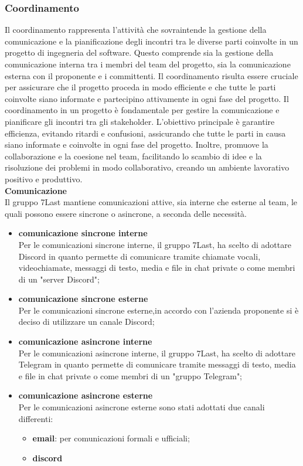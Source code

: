\subsubsection{Coordinamento}
Il coordinamento rappresenta l’attività che sovraintende la gestione della comunicazione e la pianificazione degli incontri tra le diverse parti coinvolte in un progetto di ingegneria del software. Questo comprende sia la gestione della comunicazione interna tra i membri del team del progetto, sia la comunicazione esterna con il proponente e i committenti. Il coordinamento risulta essere cruciale per assicurare che il progetto proceda in modo efficiente e che tutte le parti coinvolte siano informate e partecipino attivamente in ogni fase del progetto.
Il coordinamento in un progetto è fondamentale per gestire la comunicazione e pianificare gli incontri tra gli stakeholder. L’obiettivo principale è garantire efficienza, evitando ritardi e confusioni, assicurando che tutte le parti in causa siano informate e coinvolte in ogni fase del progetto. Inoltre, promuove la collaborazione e la coesione nel team, facilitando lo scambio di idee e la risoluzione dei problemi in modo collaborativo, creando un ambiente lavorativo positivo e produttivo.\\
\textbf{Comunicazione}\\
Il gruppo 7Last mantiene comunicazioni attive, sia interne che esterne al team, le quali possono essere sincrone o asincrone, a seconda delle necessità.
\begin{itemize}
	\item \textbf{comunicazione sincrone interne}\\Per le comunicazioni sincrone interne, il gruppo 7Last, ha scelto di adottare Discord in quanto permette di comunicare tramite chiamate vocali, videochiamate, messaggi di testo, media e file in chat private o come membri di un "server Discord";
	\item \textbf{comunicazione sincrone esterne}\\Per le comunicazioni sincrone esterne,in accordo con l’azienda proponente si è deciso di utilizzare un canale Discord;
\end{itemize}
\begin{itemize}
	\item \textbf{comunicazione asincrone interne}\\Per le comunicazioni asincrone interne, il gruppo 7Last, ha scelto di adottare Telegram in quanto permette di comunicare tramite messaggi di testo, media e file in chat private o come membri di un "gruppo Telegram";
	\item \textbf{comunicazione asincrone esterne}\\Per le comunicazioni asincrone esterne sono stati adottati due canali differenti:
	      \begin{itemize}
		      \item \textbf{email}: per comunicazioni formali e ufficiali;
		      \item \textbf{discord}
	      \end{itemize}
\end{itemize}
